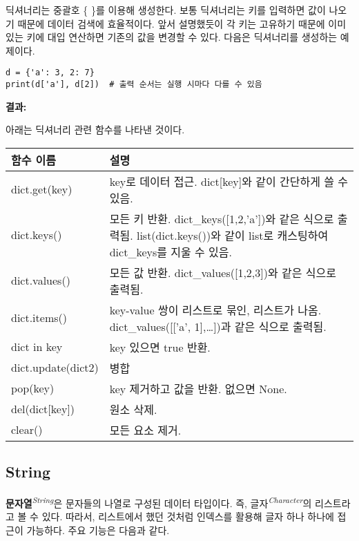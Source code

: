 딕셔너리는 중괄호 \{ \}를 이용해 생성한다. 보통 딕셔너리는 키를 입력하면 값이 나오기 때문에 데이터 검색에 효율적이다. 앞서 설명했듯이 각 키는 고유하기 때문에 이미 있는 키에 대입 연산하면 기존의 값을 변경할 수 있다. 다음은 딕셔너리를 생성하는 예제이다.

\begin{minipage}{\textwidth}
\begin{tcolorbox}[colframe=black, colback=white]
\begin{verbatim}
d = {'a': 3, 2: 7}
print(d['a'], d[2])  # 출력 순서는 실행 시마다 다를 수 있음
\end{verbatim}
\end{tcolorbox}
\textbf{결과: }
\end{minipage}

아래는 딕셔너리 관련 함수를 나타낸 것이다.

\begin{longtable}[]{@{}p{4cm} p{10cm}@{}}
    \toprule
    함수 이름 & 설명\\
    \midrule
    \endhead
    dict.get(key) & key로 데이터 접근. dict{[}key{]}와 같이 간단하게 쓸 수 있음.\\
    dict.keys() & 모든 키 반환. dict\_keys({[}1,2,'a'{]})와 같은 식으로 출력됨. list(dict.keys())와 같이 list로 캐스팅하여 dict\_keys를 지울 수 있음.\\
    dict.values() & 모든 값 반환. dict\_values({[}1,2,3{]})와 같은 식으로 출력됨.\\
    dict.items() & key-value 쌍이 리스트로 묶인, 리스트가 나옴. dict\_values({[}{[}'a', 1{]},\ldots{]})과 같은 식으로 출력됨.\\
    dict in key & key 있으면 true 반환.\\
    dict.update(dict2) & 병합\\
    pop(key) & key 제거하고 값을 반환. 없으면 None.\\
    del(dict{[}key{]}) & 원소 삭제.\\
    clear() & 모든 요소 제거.\\
    \bottomrule
\end{longtable}

\subsection{String}

\textbf{문자열}\textit{\textsuperscript{String}}은 문자들의 나열로 구성된 데이터 타입이다. 즉, 글자\textit{\textsuperscript{Character}}의 리스트라고 볼 수 있다. 따라서, 리스트에서 했던 것처럼 인덱스를 활용해 글자 하나 하나에 접근이 가능하다. 주요 기능은 다음과 같다.

